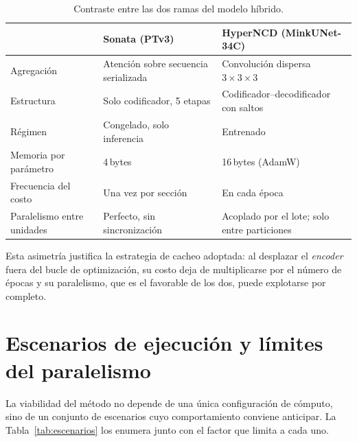 \begin{table}[H]
\centering
\caption{Contraste entre las dos ramas del modelo híbrido.}
\label{tab:contraste-ramas}
\begin{tabular}{@{}p{3.4cm}p{4.4cm}p{4.4cm}@{}}
\toprule
 & \textbf{Sonata (PTv3)} & \textbf{HyperNCD (MinkUNet-34C)} \\
\midrule
Agregación & Atención sobre secuencia serializada & Convolución dispersa $3\times3\times3$ \\
Estructura & Solo codificador, 5 etapas & Codificador--decodificador con saltos \\
Régimen & Congelado, solo inferencia & Entrenado \\
Memoria por parámetro & 4\,bytes & 16\,bytes (AdamW) \\
Frecuencia del costo & Una vez por sección & En cada época \\
Paralelismo entre unidades & Perfecto, sin sincronización & Acoplado por el lote; solo entre particiones \\
\bottomrule
\end{tabular}
\end{table}

Esta asimetría justifica la estrategia de cacheo adoptada: al desplazar el
\emph{encoder} fuera del bucle de optimización, su costo deja de multiplicarse
por el número de épocas y su paralelismo, que es el favorable de los dos, puede
explotarse por completo.

\section{Escenarios de ejecución y límites del paralelismo}
\label{sec:escenarios}

La viabilidad del método no depende de una única configuración de cómputo, sino
de un conjunto de escenarios cuyo comportamiento conviene anticipar. La
Tabla~\ref{tab:escenarios} los enumera junto con el factor que limita a cada uno.

